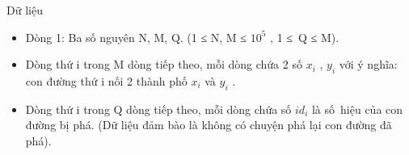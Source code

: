 Dữ liệu
\begin{itemize}
	\item     Dòng 1: Ba số nguyên N, M, Q. (1 ≤ N, M ≤ $10^{5}$    , 1 ≤ Q ≤ M).   
	\item     Dòng thứ i trong M dòng tiếp theo, mỗi dòng chứa 2 số $x_{i}$    , $y_{i}$    với ý nghĩa: con đường thứ i nối 2 thành phố $x_{i}$    và $y_{i}$    .   
	\item     Dòng thứ i trong Q dòng tiếp theo, mỗi dòng chứa số $id_{i}$    là số hiệu của con đường bị phá. (Dữ liệu đảm bào là không có chuyện phá lại con đường đã phá).   
\end{itemize}